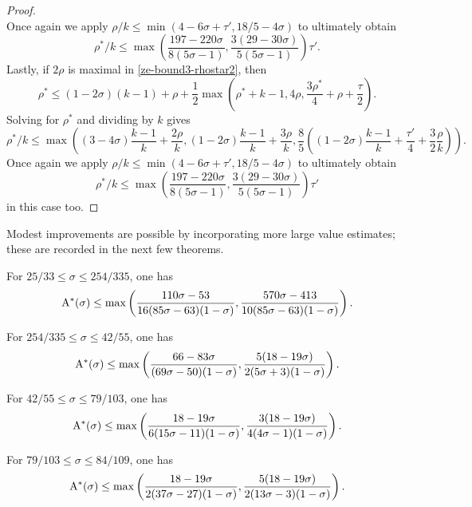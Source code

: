 \begin{proof}
\[\]
Once again we apply $\rho/k \le \min(4 - 6\sigma + \tau', 18/5 - 4\sigma)$ to ultimately obtain
\[
\rho^*/k \le \max\left(\frac{197 - 220\sigma}{8(5\sigma - 1)}, \frac{3(29 - 30\sigma)}{5(5\sigma - 1)}\right)\tau'.
\]
Lastly, if $2\rho$ is maximal in \eqref{ze-bound3-rhostar2}, then 
\[
\rho^* \le (1 - 2\sigma)(k - 1) + \rho + \frac{1}{2}\max(\rho^*+k - 1, 4\rho, \frac{3\rho^*}{4} + \rho+\frac{\tau}{2}).
\]
Solving for $\rho^*$ and dividing by $k$ gives
\[
\rho^*/k \le \max((3 - 4\sigma)\frac{k - 1}{k} + \frac{2\rho}{k}, (1 - 2\sigma)\frac{k - 1}{k} + \frac{3\rho}{k}, \frac{8}{5}((1 - 2\sigma)\frac{k - 1}{k} + \frac{\tau'}{4} + \frac{3}{2}\frac{\rho}{k})).
\]
Once again we apply $\rho/k \le \min(4 - 6\sigma + \tau', 18/5 - 4\sigma)$ to ultimately obtain
\[
\rho^*/k \le \max\left(\frac{197 - 220\sigma}{8(5\sigma - 1)}, \frac{3(29 - 30\sigma)}{5(5\sigma - 1)}\right)\tau'
\]
in this case too. 
\end{proof}

Modest improvements are possible by incorporating more large value estimates; these are recorded in the next few theorems. 

\begin{theorem}\label{imp-energy-bound4}
For $25/33 \le \sigma \le 254/335$, one has 
\[
\mathrm{A}^*(\sigma)\le \max\left(\frac{110\sigma - 53}{16(85\sigma - 63)(1 - \sigma)}, \frac{570\sigma - 413}{10(85\sigma - 63)(1 - \sigma)}\right).
\]
\end{theorem}
\derived 
{}

\begin{theorem}\label{imp-energy-bound5}
For $254/335 \le \sigma \le 42/55$, one has 
\[
\mathrm{A}^*(\sigma) \le \max\left(\frac{66 - 83\sigma}{(69\sigma - 50)(1 - \sigma)}, \frac{5(18 - 19\sigma)}{2(5\sigma + 3)(1 - \sigma)}\right).
\]
\end{theorem}
\derived 
{}

\begin{theorem}\label{imp-energy-bound6}
For $42/55 \le \sigma \le 79/103$, one has 
\[
\mathrm{A}^*(\sigma) \le \max\left(\frac{18 - 19\sigma}{6(15\sigma - 11)(1- \sigma)}, \frac{3(18-19\sigma)}{4(4\sigma-1)(1 - \sigma)}\right).
\]
\end{theorem}
\derived 
{}

\begin{theorem}\label{imp-energy-bound7}
For $79/103 \le \sigma \le 84/109$, one has 
\[
\mathrm{A}^*(\sigma) \le \max\left(\frac{18 - 19\sigma}{2(37\sigma - 27)(1 - \sigma)}, \frac{5(18 - 19\sigma)}{2(13\sigma - 3)(1 - \sigma)}\right).
\]
\end{theorem}
\derived 
{}

